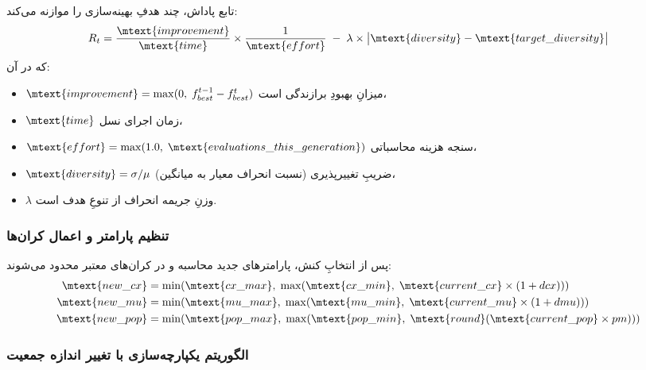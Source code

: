 تابع پاداش، چند هدفِ بهینه‌سازی را موازنه می‌کند:
\begin{equation}\label{Eq.rl_reward}
R_t = \frac{\mtext{improvement}}{\mtext{time}} \times \frac{1}{\mtext{effort}}
\;-\;
\lambda \times \big|\mtext{diversity} - \mtext{target\_diversity}\big|
\end{equation}
که در آن:
\begin{itemize}
\item \(\mtext{improvement} = \max(0,\; f_{best}^{t-1} - f_{best}^{t})\) میزانِ بهبودِ برازندگی است،
\item \(\mtext{time}\) زمان اجرای نسل،
\item \(\mtext{effort} = \max(1.0,\; \mtext{evaluations\_this\_generation})\) سنجه هزینه محاسباتی،
\item \(\mtext{diversity} = \sigma / \mu\) ضریبِ تغییرپذیری (نسبت انحراف معیار به میانگین)،
\item \(\lambda\) وزنِ جریمه انحراف از تنوعِ هدف است.
\end{itemize}

\subsubsection{تنظیم پارامتر و اعمال کران‌ها}

پس از انتخابِ کنش، پارامترهای جدید محاسبه و در کران‌های معتبر محدود می‌شوند:
\begin{equation}\label{Eq.parameter_adjustment}
\begin{aligned}
\mtext{new\_cx}  &= \min(\mtext{cx\_max},\; \max(\mtext{cx\_min},\; \mtext{current\_cx} \times (1 + dcx))) \\
\mtext{new\_mu}  &= \min(\mtext{mu\_max},\; \max(\mtext{mu\_min},\; \mtext{current\_mu} \times (1 + dmu))) \\
\mtext{new\_pop} &= \min(\mtext{pop\_max},\; \max(\mtext{pop\_min},\; \mtext{round}(\mtext{current\_pop} \times pm)))
\end{aligned}
\end{equation}

\subsubsection{الگوریتم یکپارچه‌سازی با تغییر اندازه جمعیت}

